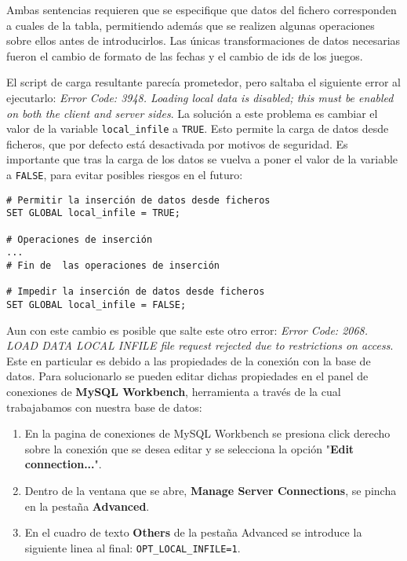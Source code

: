 \documentclass[a4paper, 11pt, oneside]{article} %
\begin{document}
Ambas sentencias requieren que se especifique que datos del fichero corresponden a cuales de la tabla, permitiendo además que se realizen algunas operaciones sobre ellos antes de introducirlos. Las únicas transformaciones de datos necesarias fueron el cambio de formato de las fechas y el cambio de ids de los juegos.

El script de carga resultante parecía prometedor, pero saltaba el siguiente error al ejecutarlo: \emph{Error Code: 3948. Loading local data is disabled; this must be enabled on both the client and server sides}. La solución a este problema es cambiar el valor de la variable \texttt{local_infile} a \texttt{TRUE}. Esto permite la carga de datos desde ficheros, que por defecto está desactivada por motivos de seguridad. Es importante que tras la carga de los datos se vuelva a poner el valor de la variable a \texttt{FALSE}, para evitar posibles riesgos en el futuro:

\begin{verbatim}
# Permitir la inserción de datos desde ficheros
SET GLOBAL local_infile = TRUE;

# Operaciones de inserción
...
# Fin de  las operaciones de inserción

# Impedir la inserción de datos desde ficheros
SET GLOBAL local_infile = FALSE;
\end{verbatim}

Aun con este cambio es posible que salte este otro error: \emph{Error Code: 2068. LOAD DATA LOCAL INFILE file request rejected due to restrictions on access}. Este en particular es debido a las propiedades de la conexión con la base de datos. Para solucionarlo se pueden editar dichas propiedades en el panel de conexiones de \textbf{MySQL Workbench}, herramienta a través de la cual trabajabamos con nuestra base de datos:

\begin{enumerate}
	\item En la pagina de conexiones de MySQL Workbench se presiona click derecho sobre la conexión que se desea editar y se selecciona la opción "\textbf{Edit connection...}".
	\item Dentro de la ventana que se abre, \textbf{Manage Server Connections}, se pincha en la pestaña \textbf{Advanced}.
	\item En el cuadro de texto \textbf{Others} de la pestaña Advanced se introduce la siguiente linea al final: \texttt{OPT_LOCAL_INFILE=1}.
\end{enumerate}
\end{document}
